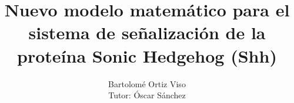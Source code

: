 \documentclass[a4paper,12pt,twoside]{report}
\begin{document}
	


\title{\LARGE {\bf Nuevo modelo matemático para el sistema de señalización de la proteína Sonic Hedgehog (Shh) }\\
 \vspace*{6mm}
}

\author{Bartolomé Ortiz Viso\\Tutor: Óscar Sánchez }

\narrowlinespacing
\maketitle

\preface






\body










\appendix

\end{document}
